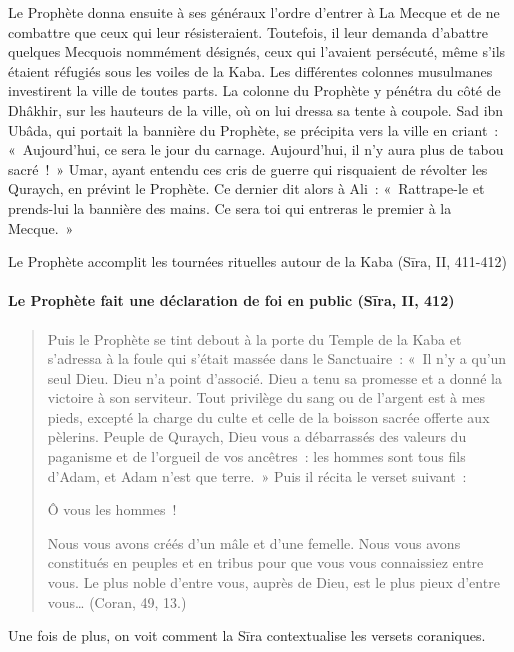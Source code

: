 {Le Prophète donna ensuite à ses généraux l'ordre d'entrer à La
Mecque et de ne combattre que ceux qui leur résisteraient. Toutefois, il
leur demanda d'abattre quelques Mecquois nommément désignés, ceux qui
l'avaient persécuté, même s'ils étaient réfugiés sous les voiles de la
Kaba. Les différentes colonnes musulmanes investirent la ville de
toutes parts. La colonne du Prophète y pénétra du côté de Dhâkhir, sur
les hauteurs de la ville, où on lui dressa sa tente à coupole. Sad
ibn Ubâda, qui portait la bannière du Prophète, se précipita vers
la ville en criant~: «~Aujourd'hui, ce sera le jour du carnage.
Aujourd'hui, il n'y aura plus de tabou sacré~!~» Umar, ayant
entendu ces cris de guerre qui risquaient de révolter les Quraych, en
prévint le Prophète. Ce dernier dit alors à Ali~: «~Rattrape-le et
prends-lui la bannière des mains. Ce sera toi qui entreras le premier à
la Mecque.~»}

Le Prophète accomplit les tournées rituelles autour de la Kaba
(Sīra, II, 411-412)

\paragraph{Le Prophète fait une déclaration de foi en public (Sīra, II, 412)}

\begin{quote}
{Puis le Prophète se tint debout à la porte du Temple de la
Kaba et s'adressa à la foule qui s'était massée dans le
Sanctuaire~: «~Il n'y a qu'un seul Dieu. Dieu n'a point d'associé. Dieu
a tenu sa promesse et a donné la victoire à son serviteur. Tout
privilège du sang ou de l'argent est à mes pieds, excepté la charge du
culte et celle de la boisson sacrée offerte aux pèlerins. Peuple de
Quraych, Dieu vous a débarrassés des valeurs du paganisme et de
l'orgueil de vos ancêtres~: les hommes sont tous fils d'Adam, et Adam
n'est que terre.~» Puis il récita le verset suivant~:}

{Ô vous les hommes~!}

{Nous vous avons créés d'un mâle et d'une femelle. Nous vous avons
constitués en peuples et en tribus pour que vous vous connaissiez entre
vous. Le plus noble d'entre vous, auprès de Dieu, est le plus pieux
d'entre vous\ldots{} (Coran, 49, 13.)}

\end{quote}
    
{Une fois de plus, on voit comment la Sīra contextualise les
versets coraniques.}

